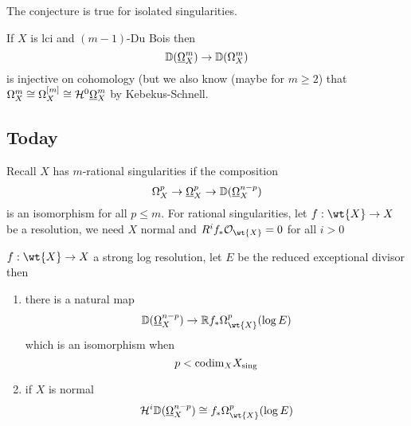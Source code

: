 \documentclass[12pt]{article}
\renewcommand{\cH}{\mathcal{H}}
\renewcommand{\codim}{\mathrm{codim}}
\begin{document}
\begin{theorem}
The conjecture is true for isolated singularities.
\end{theorem}

\begin{theorem}
If $X$ is lci and $(m-1)$-Du Bois then
\[ \mathbb{D}(\underline{\Omega}_X^m) \to \mathbb{D}(\Omega_X^m) \]
is injective on cohomology (but we also know (maybe for $m \ge 2$) that $\Omega_X^m \cong \Omega_X^{[m]} \cong \cH^0 \ulO_X^m$ by Kebekus-Schnell. 
\end{theorem}

\subsection{Today}

Recall $X$ has $m$-rational singularities if the composition
\[ \Omega_X^p \to \underline{\Omega}_X^p \to \mathbb{D}(\underline{\Omega}_X^{n-p}) \]
is an isomorphism for all $p \le m$. For rational singularities, let $f : \wt{X} \to X$ be a resolution, we need $X$ normal and $R^i f_* \struct{\wt{X}} = 0$ for all $i > 0$

\begin{prop}
$f : \wt{X} \to X$ a strong log resolution, let $E$ be the reduced exceptional divisor then
\begin{enumerate}
\item there is a natural map
\[ \DD(\ulO_X^{n-p}) \to \RR f_* \Omega_{\wt{X}}^p(\log{E}) \]
which is an isomorphism when
\[ p < \codim_X X_{\sing} \]
\item if $X$ is normal 
\[ \cH^i \DD(\ulO_X^{n-p}) \cong f_* \Omega_{\wt{X}}^p(\log{E}) \]
\end{enumerate}
\end{prop}
\end{document}
